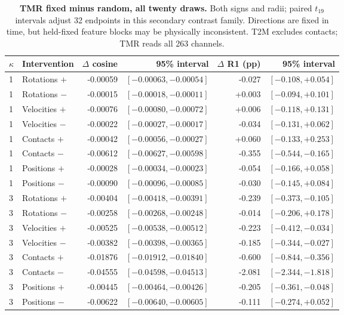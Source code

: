 \begin{table}[t]
\centering\small
\caption{\textbf{TMR fixed minus random, all twenty draws.} Both signs and radii; paired $t_{19}$ intervals adjust 32 endpoints in this secondary contrast family. Directions are fixed in time, but held-fixed feature blocks may be physically inconsistent. T2M excludes contacts; TMR reads all 263 channels.}\label{tab:table_coherent_tmr_contrast}
\begin{tabular}{@{}llrrrr@{}}\toprule
$\kappa$&Intervention&$\Delta$ cosine&95\% interval&$\Delta$ R1 (pp)&95\% interval\\\midrule
1&Rotations $+$&-0.00059&$[-0.00063,-0.00054]$&-0.027&$[-0.108,+0.054]$\\
1&Rotations $-$&-0.00015&$[-0.00018,-0.00011]$&+0.003&$[-0.094,+0.101]$\\
1&Velocities $+$&-0.00076&$[-0.00080,-0.00072]$&+0.006&$[-0.118,+0.131]$\\
1&Velocities $-$&-0.00022&$[-0.00027,-0.00017]$&-0.034&$[-0.131,+0.062]$\\
1&Contacts $+$&-0.00042&$[-0.00056,-0.00027]$&+0.060&$[-0.133,+0.253]$\\
1&Contacts $-$&-0.00612&$[-0.00627,-0.00598]$&-0.355&$[-0.544,-0.165]$\\
1&Positions $+$&-0.00028&$[-0.00034,-0.00023]$&-0.054&$[-0.166,+0.058]$\\
1&Positions $-$&-0.00090&$[-0.00096,-0.00085]$&-0.030&$[-0.145,+0.084]$\\
3&Rotations $+$&-0.00404&$[-0.00418,-0.00391]$&-0.239&$[-0.373,-0.105]$\\
3&Rotations $-$&-0.00258&$[-0.00268,-0.00248]$&-0.014&$[-0.206,+0.178]$\\
3&Velocities $+$&-0.00525&$[-0.00538,-0.00512]$&-0.223&$[-0.412,-0.034]$\\
3&Velocities $-$&-0.00382&$[-0.00398,-0.00365]$&-0.185&$[-0.344,-0.027]$\\
3&Contacts $+$&-0.01876&$[-0.01912,-0.01840]$&-0.600&$[-0.844,-0.356]$\\
3&Contacts $-$&-0.04555&$[-0.04598,-0.04513]$&-2.081&$[-2.344,-1.818]$\\
3&Positions $+$&-0.00445&$[-0.00464,-0.00426]$&-0.205&$[-0.361,-0.048]$\\
3&Positions $-$&-0.00622&$[-0.00640,-0.00605]$&-0.111&$[-0.274,+0.052]$\\
\bottomrule\end{tabular}\end{table}

